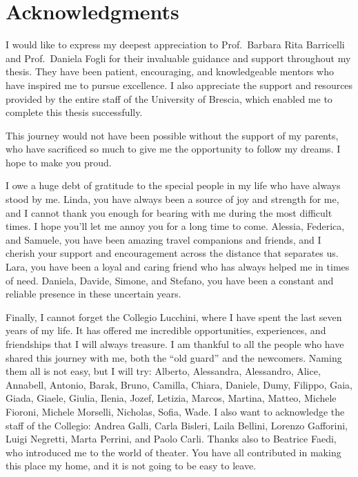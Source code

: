 \chapter*{Acknowledgments}\label{ch:acknowledgments}

I would like to express my deepest appreciation to Prof.\ Barbara Rita Barricelli and Prof.\ Daniela Fogli for their invaluable guidance and support throughout my thesis. They have been patient, encouraging, and knowledgeable mentors who have inspired me to pursue excellence. I also appreciate the support and resources provided by the entire staff of the University of Brescia, which enabled me to complete this thesis successfully.

This journey would not have been possible without the support of my parents, who have sacrificed so much to give me the opportunity to follow my dreams. I hope to make you proud.

I owe a huge debt of gratitude to the special people in my life who have always stood by me. Linda, you have always been a source of joy and strength for me, and I cannot thank you enough for bearing with me during the most difficult times. I hope you'll let me annoy you for a long time to come. Alessia, Federica, and Samuele, you have been amazing travel companions and friends, and I cherish your support and encouragement across the distance that separates us. Lara, you have been a loyal and caring friend who has always helped me in times of need. Daniela, Davide, Simone, and Stefano, you have been a constant and reliable presence in these uncertain years.

Finally, I cannot forget the Collegio Lucchini, where I have spent the last seven years of my life. It has offered me incredible opportunities, experiences, and friendships that I will always treasure. I am thankful to all the people who have shared this journey with me, both the “old guard” and the newcomers. Naming them all is not easy, but I will try: Alberto, Alessandra, Alessandro, Alice, Annabell, Antonio, Barak, Bruno, Camilla, Chiara, Daniele, Dumy, Filippo, Gaia, Giada, Giaele, Giulia, Ilenia, Jozef, Letizia, Marcos, Martina, Matteo, Michele Fioroni, Michele Morselli, Nicholas, Sofia, Wade. I also want to acknowledge the staff of the Collegio: Andrea Galli, Carla Bisleri, Laila Bellini, Lorenzo Gafforini, Luigi Negretti, Marta Perrini, and Paolo Carli. Thanks also to Beatrice Faedi, who introduced me to the world of theater. You have all contributed in making this place my home, and it is not going to be easy to leave.

